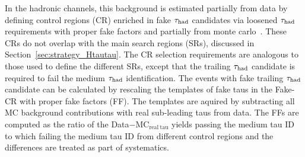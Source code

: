 In the hadronic channels, this background is estimated partially from data by defining control regions (CR) enriched in fake $\tau_{\mathrm{had}}$
candidates via loosened $\tau_{\mathrm{had}}$ requirements with proper fake factors and partially from monte carlo~\cite{ATLAS-CONF-2021-044}.
These CRs do not overlap with the main search regions (SRs), discussed in Section~\ref{sec:strategy_Htautau}.
The CR selection requirements are analogous to those used to define the different SRs, except
that the trailing $\tau_{\mathrm{had}}$ candidate is required to fail the medium $\tau_{\mathrm{had}}$ identification.
The events with fake trailing $\tau_{\mathrm{had}}$ candidate can be calculated by rescaling the templates of fake taus in the Fake-CR with proper fake factors (FF).
The templates are aquired by subtracting all MC background contributions with real sub-leading taus from data. The FFs are computed as
the ratio of the Data$-$MC$_\mathrm{real~tau}$ yields passing the medium tau ID to which failing the medium tau ID from different control regions and
the differences are treated as part of systematics.
